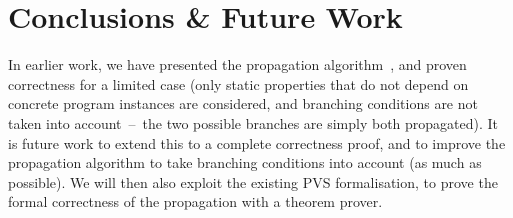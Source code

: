 \section{Conclusions \& Future Work }\label{SecConcl}

 In earlier work,
we have presented the propagation
algorithm~\cite{PavlovaBBHL04}, and proven correctness for a
limited case (only static properties that do not depend on concrete
program instances are considered, and branching conditions are not
taken into account~--~the two possible branches are simply both
propagated). It is future work to extend this to a complete
correctness proof, and to improve the propagation algorithm to take
branching conditions into account (as much as possible). We will then
also exploit the existing PVS formalisation, to prove the formal
correctness of the propagation with a theorem prover.
